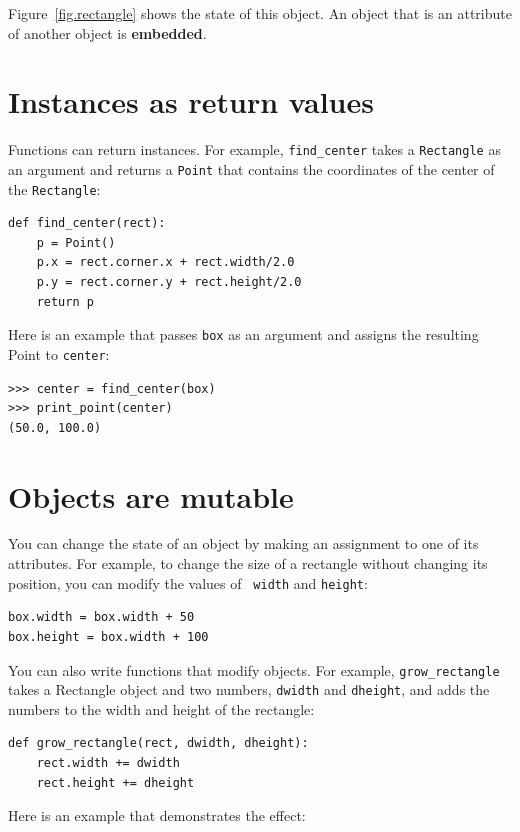 \documentclass[10pt]{book}
\begin{document}
\begin{CJK}{UTF8}{gbsn}
Figure~\ref{fig.rectangle} shows the state of this object.
An object that is an attribute of another object is {\bf embedded}.


\section{Instances as return values}

Functions can return instances.  For example, \verb"find_center"
takes a {\tt Rectangle} as an argument and returns a {\tt Point}
that contains the coordinates of the center of the {\tt Rectangle}:

\begin{verbatim}
def find_center(rect):
    p = Point()
    p.x = rect.corner.x + rect.width/2.0
    p.y = rect.corner.y + rect.height/2.0
    return p
\end{verbatim}
%
Here is an example that passes {\tt box} as an argument and assigns
the resulting Point to {\tt center}:

\begin{verbatim}
>>> center = find_center(box)
>>> print_point(center)
(50.0, 100.0)
\end{verbatim}
%

\section{Objects are mutable}

You can change the state of an object by making an assignment to one of
its attributes.  For example, to change the size of a rectangle
without changing its position, you can modify the values of {\tt
width} and {\tt height}:

\begin{verbatim}
box.width = box.width + 50
box.height = box.width + 100
\end{verbatim}
%
You can also write functions that modify objects.  For example,
\verb"grow_rectangle" takes a Rectangle object and two numbers,
{\tt dwidth} and {\tt dheight}, and adds the numbers to the
width and height of the rectangle:

\begin{verbatim}
def grow_rectangle(rect, dwidth, dheight):
    rect.width += dwidth
    rect.height += dheight
\end{verbatim}
%
Here is an example that demonstrates the effect:


\end{CJK}
\end{document}
